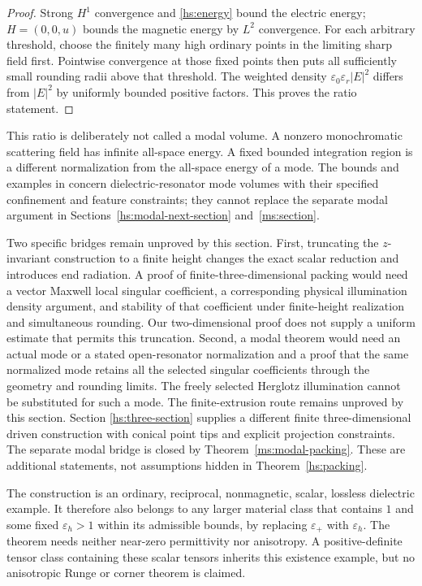 \begin{proof}
Strong $H^1$ convergence and \eqref{hs:energy} bound the electric
energy; $H=(0,0,u)$ bounds the magnetic energy by $L^2$ convergence.
For each arbitrary threshold, choose the finitely many high ordinary
points in the limiting sharp field first.  Pointwise convergence at
those fixed points then puts all sufficiently small rounding radii
above that threshold.  The weighted density
$\varepsilon_0\varepsilon_r|E|^2$ differs from $|E|^2$ by uniformly
bounded positive factors.  This proves the ratio statement.
\end{proof}

This ratio is deliberately not called a modal volume.  A nonzero
monochromatic scattering field has infinite all-space energy.  A
fixed bounded integration region is a different normalization from
the all-space energy of a mode.  The bounds and examples in
\cite{zhao2020} concern dielectric-resonator mode volumes with their
specified confinement and feature constraints; they cannot replace
the separate modal argument in Sections~\ref{hs:modal-next-section}
and~\ref{ms:section}.

\begin{remark}
\label{hs:open3d}
Two specific bridges remain unproved by this section.
First, truncating the $z$-invariant construction to a finite height
changes the exact scalar reduction and introduces end radiation.
A proof of finite-three-dimensional packing would need a vector
Maxwell local singular coefficient, a corresponding physical
illumination density argument, and stability of that coefficient
under finite-height realization and simultaneous rounding.  Our
two-dimensional proof does not supply a uniform estimate that
permits this truncation.  Second, a modal theorem would need an
actual mode or a stated open-resonator normalization and a proof
that the same normalized mode retains all the selected singular
coefficients through the geometry and rounding limits.  The freely
selected Herglotz illumination cannot be substituted for such a mode.
The finite-extrusion route remains unproved by this section. Section
\ref{hs:three-section} supplies a different finite three-dimensional
driven construction with conical point tips and explicit projection
constraints. The separate modal bridge is closed by
Theorem~\ref{ms:modal-packing}. These are
additional statements, not assumptions hidden in Theorem~\ref{hs:packing}.
\end{remark}

\begin{remark}
\label{hs:material-scope}
The construction is an ordinary, reciprocal, nonmagnetic, scalar,
lossless dielectric example.  It therefore also belongs to any
larger material class that contains $1$ and some fixed
$\varepsilon_h>1$ within its admissible bounds, by replacing
$\varepsilon_+$ with $\varepsilon_h$.  The theorem needs neither
near-zero permittivity nor anisotropy.  A positive-definite tensor
class containing these scalar tensors inherits this existence
example, but no anisotropic Runge or corner theorem is claimed.
\end{remark}

